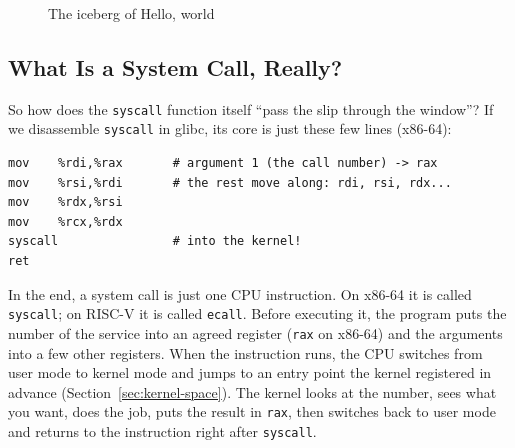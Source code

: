 \begin{figure}[htbp]
  \centering
  \caption{The iceberg of Hello, world}
  \label{fig:iceberg}
\end{figure}

\subsection{What Is a System Call, Really?}

So how does the \texttt{syscall} function itself ``pass the slip through the window''? If we disassemble \texttt{syscall} in glibc, its core is just these few lines (x86-64):
\begin{verbatim}
mov    %rdi,%rax       # argument 1 (the call number) -> rax
mov    %rsi,%rdi       # the rest move along: rdi, rsi, rdx...
mov    %rdx,%rsi
mov    %rcx,%rdx
syscall                # into the kernel!
ret
\end{verbatim}
In the end, a system call is just one CPU instruction. On x86-64 it is called \texttt{syscall}; on RISC-V it is called \texttt{ecall}. Before executing it, the program puts the number of the service into an agreed register (\texttt{rax} on x86-64) and the arguments into a few other registers. When the instruction runs, the CPU switches from user mode to kernel mode and jumps to an entry point the kernel registered in advance (Section~\ref{sec:kernel-space}). The kernel looks at the number, sees what you want, does the job, puts the result in \texttt{rax}, then switches back to user mode and returns to the instruction right after \texttt{syscall}.

